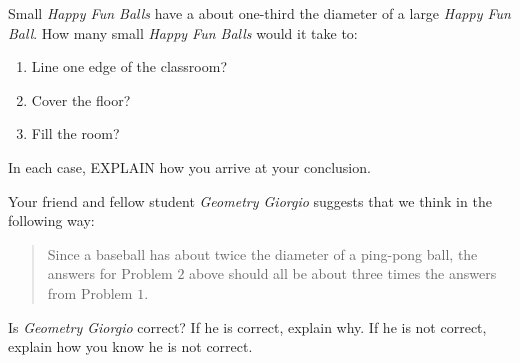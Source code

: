 \documentclass[handout,noauthor,nooutcomes,hints,12pt]{ximera}
\begin{document}
\begin{question}
Small \textit{Happy Fun Balls} have a about one-third the diameter of a large \textit{Happy Fun Ball}. How many small \textit{Happy Fun Balls} would it take to:
\begin{enumerate}
\item Line one edge of the classroom?
\item Cover the floor?
\item Fill the room?
\end{enumerate}
In each case,  EXPLAIN how you arrive at your conclusion.
\end{question}
\mynewpage




\begin{question}
  Your friend and fellow student \textit{Geometry Giorgio} suggests
  that we think in the following way:
\begin{quote}
  Since a baseball has about twice the diameter of a ping-pong
  ball, the answers for Problem $2$ above should all be about three times the
  answers from Problem $1$.
\end{quote}
Is \textit{Geometry Giorgio} correct?  If he is correct, explain
why. If he is not correct, explain how you know he is not correct.
\end{question}
\end{document}
